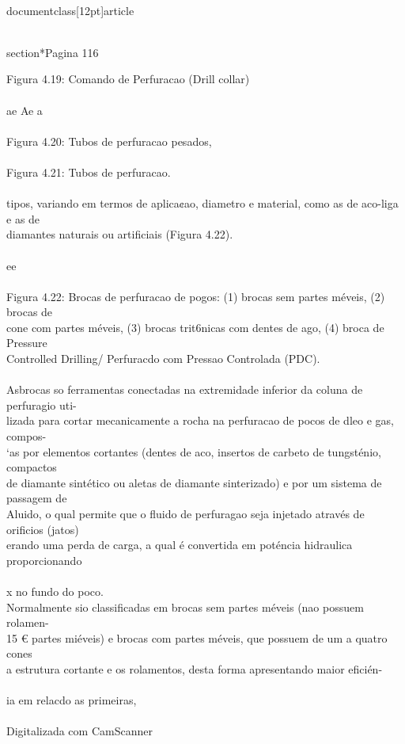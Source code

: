 \\documentclass[12pt]{article}
\begin{document}
\\section*{Pagina 116}

Figura 4.19: Comando de Perfuracao (Drill collar)\\
\\
ae Ae a\\
\\
Figura 4.20: Tubos de perfuracao pesados,\\
\\
Figura 4.21: Tubos de perfuracao.\\
\\
tipos, variando em termos de aplica¢ao, diametro e material, como as de aco-liga e as de\\
diamantes naturais ou artificiais (Figura 4.22).\\
\\
ee\\
\\
Figura 4.22: Brocas de perfuracao de pogos: (1) brocas sem partes méveis, (2) brocas de\\
cone com partes méveis, (3) brocas trit6nicas com dentes de ago, (4) broca de Pressure\\
Controlled Drilling/ Perfuracdo com Pressao Controlada (PDC).\\
\\
Asbrocas so ferramentas conectadas na extremidade inferior da coluna de perfuragio uti-\\
lizada para cortar mecanicamente a rocha na perfuracao de pocos de dleo e gas, compos-\\
‘as por elementos cortantes (dentes de aco, insertos de carbeto de tungsténio, compactos\\
de diamante sintético ou aletas de diamante sinterizado) e por um sistema de passagem de\\
Aluido, o qual permite que o fluido de perfuragao seja injetado através de orificios (jatos)\\
erando uma perda de carga, a qual é convertida em poténcia hidraulica proporcionando\\
\\
x no fundo do poco.\\
Normalmente sio classificadas em brocas sem partes méveis (nao possuem rolamen-\\
15 € partes miéveis) e brocas com partes méveis, que possuem de um a quatro cones\\
a estrutura cortante e os rolamentos, desta forma apresentando maior eficién-\\
\\
ia em relacdo as primeiras,\\
\\
Digitalizada com CamScanner\\
\end{document}
